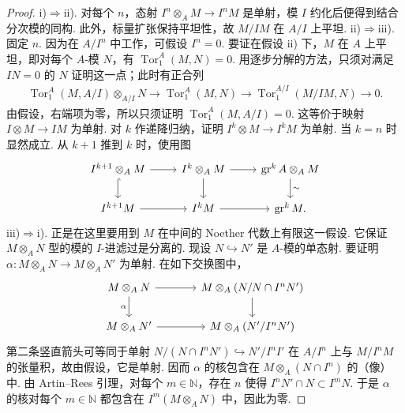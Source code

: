 \begin{proof}
\textup{i)$\Rightarrow$ii).} 对每个 $n$，态射 $I^n\otimes_A M\longrightarrow I^nM$ 是单射，模 $I$ 约化后便得到结合分次模的同构. 此外，标量扩张保持平坦性，故 $M/IM$ 在 $A/I$ 上平坦.
\textup{ii)$\Rightarrow$iii).} 固定 $n$. 因为在 $A/I^n$ 中工作，可假设 $I^n=0$. 要证在假设 ii) 下，$M$ 在 $A$ 上平坦，即对每个 $A$-模 $N$，有 $\operatorname{Tor}_1^A(M,N)=0$. 用逐步分解的方法，只须对满足 $IN=0$ 的 $N$ 证明这一点；此时有正合列
\begin{align*}
\operatorname{Tor}_1^A(M,A/I)\otimes_{A/I}N\longrightarrow\operatorname{Tor}_1^A(M,N)\longrightarrow\operatorname{Tor}_1^{A/I}(M/IM,N)\longrightarrow0.
\end{align*}
由假设，右端项为零，所以只须证明 $\operatorname{Tor}_1^A(M,A/I)=0$. 这等价于映射 $I\otimes M\longrightarrow IM$ 为单射. 对 $k$ 作递降归纳，证明 $I^k\otimes M\longrightarrow I^kM$ 为单射. 当 $k=n$ 时显然成立. 从 $k+1$ 推到 $k$ 时，使用图
\begin{align*}
\begin{tikzcd}[ampersand replacement=\&]
I^{k+1}\otimes_A M\arrow[r]\arrow[d,hook] \& I^k\otimes_A M\arrow[r]\arrow[d] \& \operatorname{gr}^k A\otimes_A M\arrow[d,"\sim"] \\
I^{k+1}M\arrow[r] \& I^kM\arrow[r] \& \operatorname{gr}^k M.
\end{tikzcd}
\end{align*}
\textup{iii)$\Rightarrow$i).} 正是在这里要用到 $M$ 在中间的 Noether 代数上有限这一假设. 它保证 $M\otimes_A N$ 型的模的 $I$-进滤过是分离的. 现设 $N\hookrightarrow N'$ 是 $A$-模的单态射. 要证明 $\alpha:M\otimes_A N\longrightarrow M\otimes_A N'$ 为单射. 在如下交换图中，
\begin{align*}
\begin{tikzcd}[ampersand replacement=\&,column sep=large]
M\otimes_A N\arrow[r]\arrow[d,"\alpha"'] \& M\otimes_A(N/N\cap I^nN')\arrow[d] \\
M\otimes_A N'\arrow[r] \& M\otimes_A(N'/I^nN')
\end{tikzcd}
\end{align*}
第二条竖直箭头可等同于单射 $N/(N\cap I^nN')\hookrightarrow N'/I^nI'$ 在 $A/I^n$ 上与 $M/I^nM$ 的张量积，故由假设，它是单射. 因而 $\alpha$ 的核包含在 $M\otimes_A(N\cap I^n)$ 的（像）中. 由 Artin--Rees 引理，对每个 $m\in\mathbb N$，存在 $n$ 使得 $I^nN'\cap N\subset I^mN$. 于是 $\alpha$ 的核对每个 $m\in\mathbb N$ 都包含在 $I^m(M\otimes_A N)$ 中，因此为零.
\end{proof}
